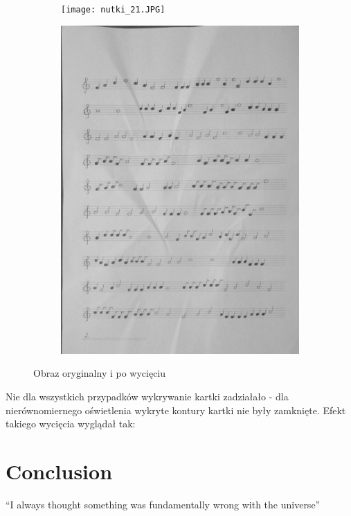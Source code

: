 \documentclass{article}
\begin{document}
\begin{figure}
    \centering
    \begin{subfigure}{.5\textwidth}
        \centering
        \graphicspath{ {Resources/} }
        \texttt{[image: nutki\_21.JPG]}
        \label{fig:sub1}
    \end{subfigure}%
    \begin{subfigure}{.5\textwidth}
        \centering
        \graphicspath{ {output/} }
        \includegraphics[width=.9\linewidth]{warped21_gray.jpg}
        \label{fig:sub2}
    \end{subfigure}
    \caption{Obraz oryginalny i po wycięciu}
    \label{fig:test}
\end{figure}

\pagebreak

Nie dla wszystkich przypadków wykrywanie kartki zadziałało - dla nierównomiernego oświetlenia wykryte kontury kartki nie były zamknięte. 
Efekt takiego wycięcia wyglądał tak:

\section{Conclusion}
``I always thought something was fundamentally wrong with the universe'' \citep{adams1995hitchhiker}



\end{document}
